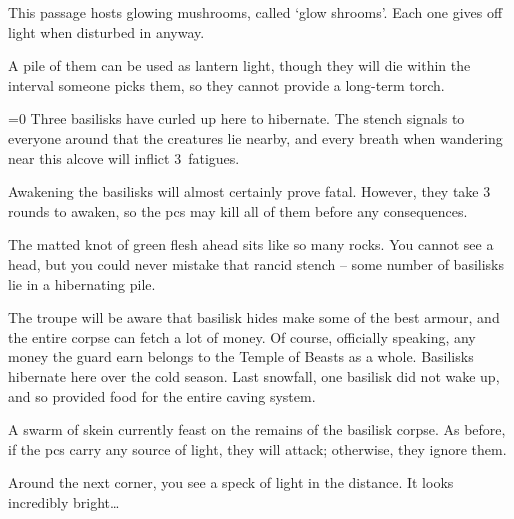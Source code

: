 \begin{multicols}{2}

This passage hosts glowing mushrooms, called `glow shrooms'.%
Each one gives off light when disturbed in anyway.

A pile of them can be used as lantern light, though they will die within the \gls{interval} someone picks them, so they cannot provide a long-term torch.


\ifnum\value{temperature}=0
  Three basilisks have curled up here to hibernate.
  The stench signals to everyone around that the creatures lie nearby, and every breath when wandering near this alcove will inflict 3~\glspl{fatigue}.

  Awakening the basilisks will almost certainly prove fatal.
  However, they take 3 rounds to awaken, so the \glspl{pc} may kill all of them before any consequences.

  \begin{boxtext}
    The matted knot of green flesh ahead sits like so many rocks.
    You cannot see a head, but you could never mistake that rancid stench -- some number of basilisks lie in a hibernating pile.
  \end{boxtext}


  The troupe will be aware that basilisk hides make some of the best armour, and the entire corpse can fetch a lot of money.
  Of course, officially speaking, any money the \gls{guard} earn belongs to the Temple of Beasts as a whole.%
\else
  Basilisks hibernate here over the cold season.
  Last snowfall, one basilisk did not wake up, and so provided food for the entire caving system.

  A swarm of skein currently feast on the remains of the basilisk corpse.
  As before, if the \glspl{pc} carry any source of light, they will attack; otherwise, they ignore them.

  \skeinSwarm

\fi

\begin{boxtext}
  Around the next corner, you see a speck of light in the distance.
  It looks incredibly bright\ldots
\end{boxtext}



\end{multicols}
